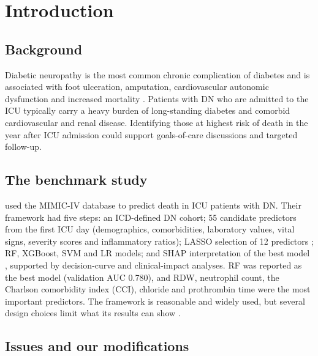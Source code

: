 \hypertarget{introduction}{%
\section{Introduction}\label{introduction}}

\hypertarget{background}{%
\subsection{Background}\label{background}}

Diabetic neuropathy is the most common chronic complication of diabetes and is
associated with foot ulceration, amputation, cardiovascular autonomic
dysfunction and increased mortality \parencite{popbusui2017,feldman2019}.
Patients with DN who are admitted to the ICU typically carry a heavy burden of
long-standing diabetes and comorbid cardiovascular and renal disease.
Identifying those at highest risk of death in the year after ICU admission could
support goals-of-care discussions and targeted follow-up.

\hypertarget{the-benchmark-study}{%
\subsection{The benchmark study}\label{the-benchmark-study}}

\textcite{huang2025} used the MIMIC-IV database \parencite{johnson2023} to
predict death in ICU patients with DN. Their framework had five steps: an
ICD-defined DN cohort; 55 candidate predictors from the first ICU day
(demographics, comorbidities, laboratory values, vital signs, severity scores
and inflammatory ratios); LASSO selection of 12 predictors
\parencite{tibshirani1996}; RF, XGBoost, SVM and LR models; and SHAP
interpretation of the best model \parencite{lundberg2017}, supported by
decision-curve and clinical-impact analyses. RF was reported as the best model
(validation AUC 0.780), and RDW, neutrophil count, the Charlson comorbidity
index (CCI), chloride and prothrombin time were the most important predictors.
The framework is reasonable and widely used, but several design choices limit
what its results can show \parencite{collins2015}.

\hypertarget{issues-and-our-modifications}{%
\subsection{Issues and our modifications}\label{issues-and-our-modifications}}


